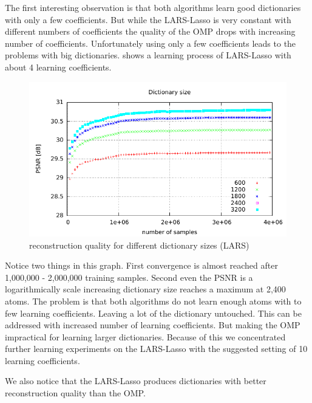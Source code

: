 
The first interesting observation is that both algorithms learn good
dictionaries with only a few coefficients. But while the LARS-Lasso is very
constant with different numbers of coefficients the quality of the OMP drops
with increasing number of coefficients. 
Unfortunately using only a few coefficients leads to the problems with big
dictionaries.  shows a learning process of
LARS-Lasso with about 4 learning coefficients.
\begin{figure}[H]
\centering
\includegraphics[width = 1.0\textwidth]{../tests/results/dictSizeLasso.pdf}
\caption{reconstruction quality for different dictionary sizes (LARS)}
\label{fig:dictSizeLassoBad}
\end{figure}
Notice two things in this graph. First convergence is almost reached
after 1,000,000 - 2,000,000 training samples. Second even the PSNR is a
logarithmically scale increasing dictionary size reaches a maximum at
2,400 atoms. 
The problem is that both algorithms do not learn enough atoms with to few
learning coefficients. Leaving a lot of the dictionary untouched. This can be
addressed with increased number of learning coefficients. But making the OMP
impractical for learning larger dictionaries.
Because of this we concentrated further learning experiments on the LARS-Lasso
with the suggested setting of 10 learning coefficients. 

We also notice that the LARS-Lasso produces dictionaries with better
reconstruction quality than the OMP.

